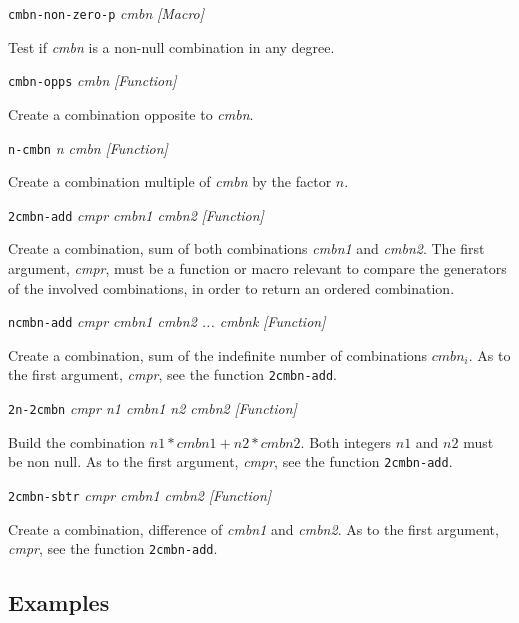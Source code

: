{{\leftskip=5mm
{\tt cmbn-non-zero-p} {\em cmbn} \hfill {\em [Macro]} \par}
{\leftskip=15mm
Test if {\em cmbn} is a non-null combination in any degree. \par}
{\leftskip=5mm
{\tt cmbn-opps} {\em cmbn} \hfill {\em [Function]} \par}
{\leftskip=15mm
Create a  combination opposite to {\em cmbn}. \par}
{\leftskip=5mm
{\tt n-cmbn} {\em n cmbn} \hfill {\em [Function]} \par}
{\leftskip=15mm
Create a  combination multiple of  {\em cmbn} by the factor $n$. \par}
{\leftskip=5mm
{\tt 2cmbn-add} {\em cmpr cmbn1 cmbn2} \hfill {\em [Function]} \par}
{\leftskip=15mm
Create a combination, sum of both combinations {\em cmbn1} and {\em cmbn2}. The first
argument, {\em cmpr}, must be a function or macro relevant to compare the generators of the
involved combinations, in order to return an ordered combination. \par}
}
\newpage
{\parindent=0mm
{\leftskip=5mm
{\tt ncmbn-add} {\em cmpr cmbn1 cmbn2 ... cmbnk} \hfill {\em [Function]} \par}
{\leftskip=15mm
Create a combination, sum of the indefinite number of combinations $cmbn_i$. As to the first
argument, {\em cmpr}, see the function {\tt 2cmbn-add}. \par}
{\leftskip=5mm
{\tt 2n-2cmbn} {\em cmpr n1 cmbn1 n2 cmbn2} \hfill {\em [Function]} \par}
{\leftskip=15mm
Build the combination $n1 * cmbn1 + n2 * cmbn2$. Both integers $n1$ and $n2$ must be
non null. As to the first argument, {\em cmpr}, see the function {\tt 2cmbn-add}. \par}
{\leftskip=5mm
{\tt 2cmbn-sbtr} {\em cmpr cmbn1 cmbn2} \hfill {\em [Function]} \par}
{\leftskip=15mm
Create a combination, difference of {\em cmbn1} and {\em cmbn2}.
As to the first argument, {\em cmpr}, see the function {\tt 2cmbn-add}. \par}
}
\subsection* {Examples}

